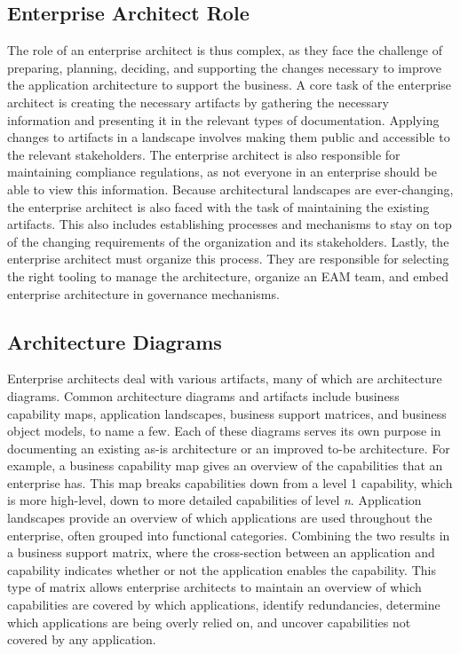 \subsection{Enterprise Architect Role}
\label{sub:background:ea}
The role of an enterprise architect is thus complex, as they face the challenge of preparing, planning, deciding, and supporting the changes necessary to improve the application architecture to support the business. A core task of the enterprise architect is creating the necessary artifacts by gathering the necessary information and presenting it in the relevant types of documentation. Applying changes to artifacts in a landscape involves making them public and accessible to the relevant stakeholders. The enterprise architect is also responsible for maintaining compliance regulations, as not everyone in an enterprise should be able to view this information. Because architectural landscapes are ever-changing, the enterprise architect is also faced with the task of maintaining the existing artifacts. This also includes establishing processes and mechanisms to stay on top of the changing requirements of the organization and its stakeholders. Lastly, the enterprise architect must organize this process. They are responsible for selecting the right tooling to manage the architecture, organize an EAM team, and embed enterprise architecture in governance mechanisms. \cite[pg. 152-154]{jung2021masterclass}

\subsection{Architecture Diagrams}
\label{sub:diagrams}
Enterprise architects deal with various artifacts, many of which are architecture diagrams. Common architecture diagrams and artifacts include business capability maps, application landscapes, business support matrices, and business object models, to name a few. Each of these diagrams serves its own purpose in documenting an existing as-is architecture or an improved to-be architecture. For example, a business capability map gives an overview of the capabilities that an enterprise has. This map breaks capabilities down from a level 1 capability, which is more high-level, down to more detailed capabilities of level \textit{n}. Application landscapes provide an overview of which applications are used throughout the enterprise, often grouped into functional categories. \cite[pg. 53, 76]{jung2021masterclass} Combining the two results in a business support matrix, where the cross-section between an application and capability indicates whether or not the application enables the capability. This type of matrix allows enterprise architects to maintain an overview of which capabilities are covered by which applications, identify redundancies, determine which applications are being overly relied on, and uncover capabilities not covered by any application. \cite{schlor2018analysis}

